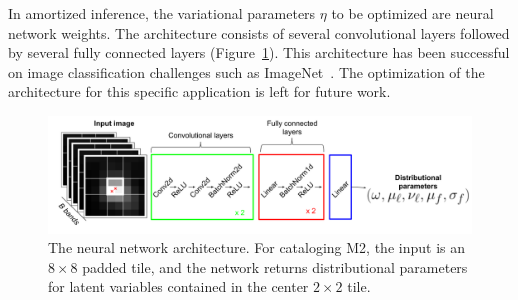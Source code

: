 In amortized inference, the variational parameters $\eta$ to be optimized are neural network weights.
The architecture consists of several convolutional layers followed by several fully connected layers (Figure~\ref{fig:starnet_arch}). 
This architecture has been successful on image classification challenges such as ImageNet~\citep{imagenet2015}. 
The optimization of the architecture for this specific application is left for future work. 



\begin{figure}[!tb]
    \centering
    \includegraphics[width=\textwidth]{figures/vi_figures/starnet_archetecture4.png}
    \vspace{-1.cm}
    \caption{The neural network architecture. For cataloging M2, the input is an $8\times 8$ padded tile, and the network returns distributional parameters for latent variables contained in the center $2\times 2$ tile.
    }
    \label{fig:starnet_arch}
\end{figure}


